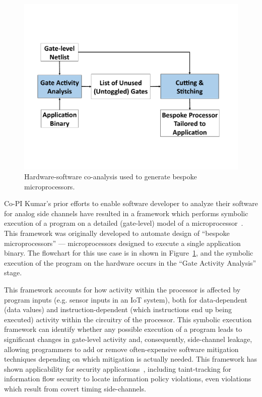 \begin{figure}
\vspace{-0.15in}
\includegraphics[width=\linewidth]{./figure/Bespoke_Flow_Fig.pdf}
\vspace{-0.3in}
\caption{Hardware-software co-analysis used to generate bespoke microprocessors.}
\label{fig:bespoke}
\end{figure}
Co-PI Kumar's prior efforts to enable software developer to analyze their software for analog side channels have resulted in a framework which performs symbolic execution of a program on a detailed (gate-level) model of a microprocessor~\cite{cherupalli2017}.
This framework was originally developed to automate design of ``bespoke microprocessors'' --- microprocessors designed to execute a single application binary.
The flowchart for this use case is in shown in Figure~\ref{fig:bespoke}, and the symbolic execution of the program on the hardware occurs in the ``Gate Activity Analysis'' stage.

This framework accounts for how activity within the processor is affected by program inputs (e.g. sensor inputs in an IoT system), both for data-dependent (data values) and instruction-dependent (which instructions end up being executed) activity within the circuitry of the processor. This symbolic execution framework can identify whether any possible execution of a program leads to significant changes in gate-level activity and, consequently, side-channel leakage, allowing programmers to add or remove often-expensive software mitigation techniques depending on which mitigation is actually needed. This framework has shown applicability for security applications~\cite{cherupalli20172}, including
taint-tracking for information flow security to locate information policy
violations, even violations which result from covert timing side-channels.

